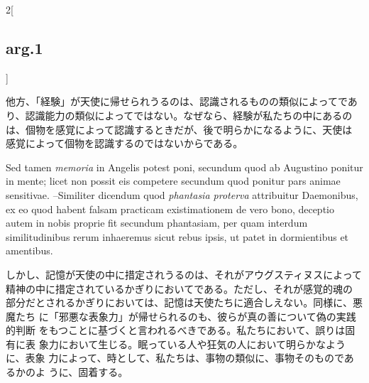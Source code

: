 \documentclass[paper=a4paper,fontsize=10pt,jafontsize=9pt,titlepage]{jlreq}
\begin{document}
\begin{paracol}{2}[\subsection{arg.1}]
\switchcolumn

他方、「経験」が天使に帰せられうるのは、認識されるものの類似によってであ
 り、認識能力の類似によってではない。なぜなら、経験が私たちの中にあるの
 は、個物を感覚によって認識するときだが、後で明らかになるように、天使は
 感覚によって個物を認識するのではないからである。

\switchcolumn*

Sed tamen {\itshape memoria} in Angelis
potest poni, secundum quod ab Augustino ponitur in mente; licet non
possit eis competere secundum quod ponitur pars animae
sensitivae. --Similiter dicendum quod {\itshape phantasia proterva} attribuitur
Daemonibus, ex eo quod habent falsam practicam existimationem de vero
bono, deceptio autem in nobis proprie fit secundum phantasiam, per quam
interdum similitudinibus rerum inhaeremus sicut rebus ipsis, ut patet in
dormientibus et amentibus.

\switchcolumn

しかし、記憶が天使の中に措定されうるのは、それがアウグスティヌスによって
 精神の中に措定されているかぎりにおいてである。ただし、それが感覚的魂の
 部分だとされるかぎりにおいては、記憶は天使たちに適合しえない。同様に、悪魔たち
 に「邪悪な表象力」が帰せられるのも、彼らが真の善について偽の実践的判断
 をもつことに基づくと言われるべきである。私たちにおいて、誤りは固有に表
 象力において生じる。眠っている人や狂気の人において明らかなように、表象
 力によって、時として、私たちは、事物の類似に、事物そのものであるかのよ
 うに、固着する。

\end{paracol}
\end{document}
